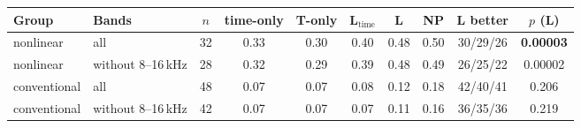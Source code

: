 \begin{tabular}{llcccccccc}
\toprule
Group & Bands & $n$ & time-only & T-only & L$_{\mathrm{time}}$ & L & NP & L better & $p$ (L)\\
\midrule
nonlinear & all & 32 & 0.33 & 0.30 & 0.40 & 0.48 & 0.50 & 30/29/26 & \textbf{0.00003}\\
nonlinear & without 8--16\,kHz & 28 & 0.32 & 0.29 & 0.39 & 0.48 & 0.49 & 26/25/22 & 0.00002\\
conventional & all & 48 & 0.07 & 0.07 & 0.08 & 0.12 & 0.18 & 42/40/41 & 0.206\\
conventional & without 8--16\,kHz & 42 & 0.07 & 0.07 & 0.07 & 0.11 & 0.16 & 36/35/36 & 0.219\\
\bottomrule
\end{tabular}

